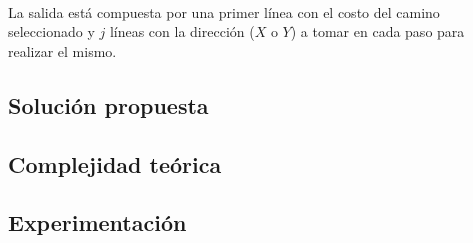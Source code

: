 	~

	La salida está compuesta por una primer línea con el costo del camino
	seleccionado y $j$ líneas con la dirección ($X$ o $Y$) a tomar en cada paso para
	realizar el mismo.

    \subsection{Solución propuesta}

    \subsection{Complejidad teórica}

    \subsection{Experimentación}

